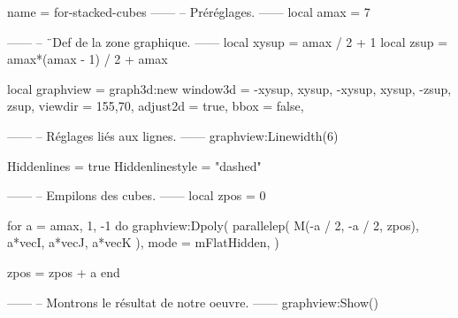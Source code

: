 \documentclass[border = 3pt]{standalone}
\begin{document}
\begin{luadraw*}{name = for-stacked-cubes}
------
-- Préréglages.
------
local amax = 7

------
-- ¨Def de la zone graphique.
------
local xysup = amax / 2 + 1
local zsup  = amax*(amax - 1) / 2 + amax

local graphview = graph3d:new{
  window3d = {-xysup, xysup, -xysup, xysup, -zsup, zsup},
  viewdir  = {155,70},
  adjust2d = true,
  bbox     = false,
}

------
-- Réglages liés aux lignes.
------
graphview:Linewidth(6)

Hiddenlines     = true
Hiddenlinestyle = "dashed"

------
-- Empilons des cubes.
------
local zpos  = 0

for a = amax, 1, -1 do
  graphview:Dpoly(
    parallelep(
      M(-a / 2, -a / 2, zpos),
      a*vecI, a*vecJ, a*vecK
    ),
    {
      mode = mFlatHidden,
    }
  )

  zpos = zpos + a
end

------
-- Montrons le résultat de notre oeuvre.
------
graphview:Show()
\end{luadraw*}
\end{document}
